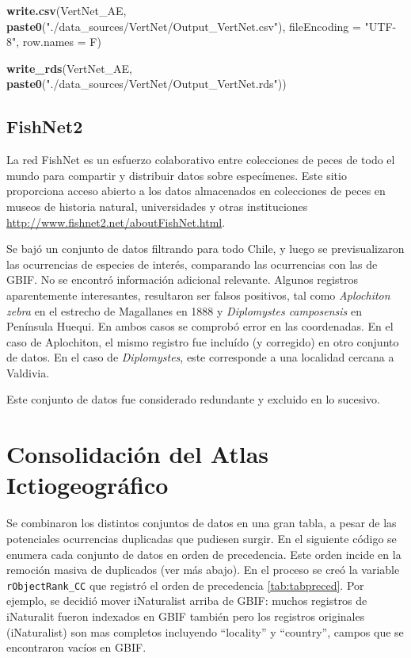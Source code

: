 \documentclass[sn-apa,pdflatex]{sn-jnl}
\newenvironment{Shaded}{\begin{snugshade}}{\end{snugshade}}
\newcommand{\AttributeTok}[1]{\textcolor[rgb]{0.13,0.29,0.53}{#1}}
\newcommand{\FunctionTok}[1]{\textcolor[rgb]{0.13,0.29,0.53}{\textbf{#1}}}
\newcommand{\NormalTok}[1]{#1}
\newcommand{\StringTok}[1]{\textcolor[rgb]{0.31,0.60,0.02}{#1}}
\begin{document}
\begin{Shaded}
\begin{Highlighting}[]
\FunctionTok{write.csv}\NormalTok{(VertNet\_AE, }\FunctionTok{paste0}\NormalTok{(}\StringTok{"./data\_sources/VertNet/Output\_VertNet.csv"}\NormalTok{),}
    \AttributeTok{fileEncoding =} \StringTok{"UTF{-}8"}\NormalTok{, }\AttributeTok{row.names =}\NormalTok{ F)}

\FunctionTok{write\_rds}\NormalTok{(VertNet\_AE, }\FunctionTok{paste0}\NormalTok{(}\StringTok{"./data\_sources/VertNet/Output\_VertNet.rds"}\NormalTok{))}
\end{Highlighting}
\end{Shaded}

\subsection{FishNet2}\label{fishnet2}

La red FishNet es un esfuerzo colaborativo entre colecciones de peces de
todo el mundo para compartir y distribuir datos sobre especímenes. Este
sitio proporciona acceso abierto a los datos almacenados en colecciones
de peces en museos de historia natural, universidades y otras
instituciones \url{http://www.fishnet2.net/aboutFishNet.html}.

Se bajó un conjunto de datos filtrando para todo Chile, y luego se
previsualizaron las ocurrencias de especies de interés, comparando las
ocurrencias con las de GBIF. No se encontró información adicional
relevante. Algunos registros aparentemente interesantes, resultaron ser
falsos positivos, tal como \emph{Aplochiton zebra} en el estrecho de
Magallanes en 1888 y \emph{Diplomystes camposensis} en Península Huequi.
En ambos casos se comprobó error en las coordenadas. En el caso de
Aplochiton, el mismo registro fue incluído (y corregido) en otro
conjunto de datos. En el caso de \emph{Diplomystes}, este corresponde a
una localidad cercana a Valdivia.

Este conjunto de datos fue considerado redundante y excluido en lo
sucesivo.

\section{Consolidación del Atlas
Ictiogeográfico}\label{consolidaciuxf3n-del-atlas-ictiogeogruxe1fico}

Se combinaron los distintos conjuntos de datos en una gran tabla, a
pesar de las potenciales ocurrencias duplicadas que pudiesen surgir. En
el siguiente código se enumera cada conjunto de datos en orden de
precedencia. Este orden incide en la remoción masiva de duplicados (ver
más abajo). En el proceso se creó la variable \texttt{rObjectRank\_CC}
que registró el orden de precedencia \ref{tab:tabpreced}. Por ejemplo,
se decidió mover iNaturalist arriba de GBIF: muchos registros de
iNaturalit fueron indexados en GBIF también pero los registros
originales (iNaturalist) son mas completos incluyendo ``locality'' y
``country'', campos que se encontraron vacíos en GBIF.
\end{document}
